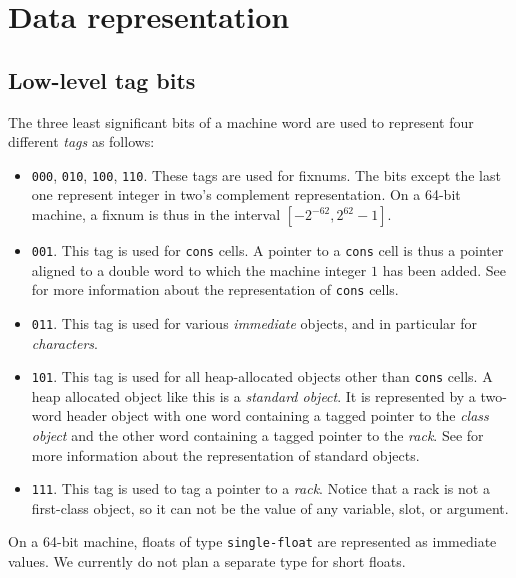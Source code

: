\chapter{Data representation}
\label{chap-data-representation}

\section{Low-level tag bits}

The three least significant bits of a machine word are used to
represent four different \emph{tags} as follows:

\begin{itemize}
\item \texttt{000}, \texttt{010}, \texttt{100}, \texttt{110}.  These
  tags are used for fixnums.  The bits except the last one represent
  integer in two's complement representation.  On a 64-bit machine, a
  fixnum is thus in the interval $[-2^{-62}, 2^{62} - 1]$.
\item \texttt{001}.  This tag is used for \texttt{cons} cells.  A
  pointer to a \texttt{cons} cell is thus a pointer aligned to a
  double word to which the machine integer $1$ has been added.  See
   for more information
  about the representation of \texttt{cons} cells.
\item \texttt{011}.  This tag is used for various \emph{immediate}
  objects, and in particular for \emph{characters}.
\item \texttt{101}.  This tag is used for all heap-allocated
  \commonlisp{} objects other than \texttt{cons} cells.  A heap
  allocated object like this is a \emph{standard object}.  It
  is represented by a two-word header object with one word containing
  a tagged pointer to the \emph{class object} and the other word
  containing a tagged pointer to the \emph{rack}.  See
   for more
  information about the representation of standard objects.
\item \texttt{111}.  This tag is used to tag a pointer to a
  \emph{rack}.  Notice that a rack is not a first-class \commonlisp{}
  object, so it can not be the value of any variable, slot, or
  argument.
\end{itemize}

On a 64-bit machine, floats of type \texttt{single-float} are
represented as immediate values.  We currently do not plan a separate
type for short floats.

